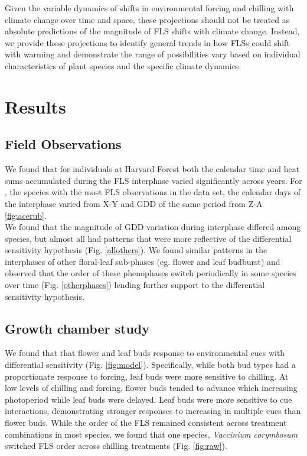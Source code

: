 \documentclass[11pt]{article}
\begin{document}
\noindent Given the variable dynamics of shifts in environmental forcing and chilling with climate change over time and space, these projections should not be treated as absolute predictions of the magnitude of FLS shifts with climate change. Instead, we provide these projections to identify general trends in how FLSs could shift with warming and demonstrate the range of possibilities vary based on individual characteristics of plant species and the specific climate dynamics.\\

\section*{Results}
\subsection*{Field Observations}
We found that for individuals at Harvard Forest both the calendar time and heat sums accumulated during the FLS interphase varied significantly across years. For , the species with the most FLS observations in the data set, the calendar days of the interphase varied from X-Y and GDD of the same period from Z-A \ref{fig:acerub}.\\

\noindent We found that the magnitude of GDD variation during interphase differed among species, but almost all had patterns that were more reflective of the differential sensitivity hypothesis (Fig. \ref{allothers}). We found similar patterns in the interphases of other floral-leaf sub-phases (eg. flower and leaf budburst) and observed that the order of these phenophases switch periodically in some species over time (Fig. \ref{otherphases}) lending further support to the differential sensitivity hypothesis. 

\subsection*{Growth chamber study}
\noindent We found that that flower and leaf buds response to environmental cues with differential sensitivity (Fig. \ref{fig:model}). Specifically, while both bud types had a proportionate response to forcing, leaf buds were more sensitive to chilling. At low levels of chilling and forcing, flower buds tended to advance which increasing photoperiod while leaf buds were delayed. Leaf buds were more sensitive to cue interactions, demonstrating stronger responses to increasing in multiple cues than flower buds. While the order of the FLS remained consistent across treatment combinations in most species, we found that one species, \textit{Vaccinium corymbosum} switched FLS order across chilling treatments (Fig. \ref{fig:raw}). 
\end{document}
